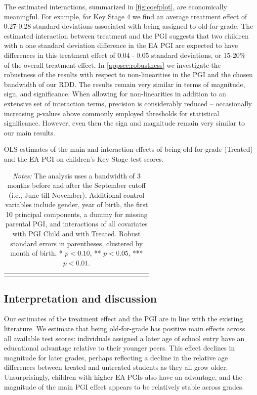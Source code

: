 \documentclass[12pt,a4paper]{article}
\begin{document}
\begin{bibunit}
The estimated interactions, summarized in \autoref{fig:coefplot}, are economically meaningful. For example, for Key Stage 4 we find an average treatment effect of 0.27-0.28 standard deviations associated with being assigned to old-for-grade. The estimated interaction between treatment and the PGI suggests that two children with a one standard deviation difference in the EA PGI are expected to have differences in this treatment effect of 0.04 - 0.05 standard deviations, or 15-20\% of the overall treatment effect. In \autoref{appsec:robustness} we investigate the robustness of the results with respect to non-linearities in the PGI and the chosen bandwidth of our RDD. The results remain very similar in terms of magnitude, sign, and significance. When allowing for non-linearities in addition to an extensive set of interaction terms, precision is considerably reduced -- occasionally increasing \textit{p}-values above commonly employed thresholds for statistical significance. However, even then the sign and magnitude remain very similar to our main results. 

\begin{table}
\caption{OLS estimates of the main and interaction effects of being old-for-grade (Treated) and the EA PGI on children's Key Stage test scores.}
\centering
{\scriptsize
\begin{tabular}{lcccccccccccccccccccc}
\toprule

\bottomrule
\addlinespace[.75ex]
\end{tabular}
\label{tab:MoB_ks}
}
\caption*{\scriptsize \noindent \textit{Notes:} The analysis uses a bandwidth of 3 months before and after the September cutoff (i.e., June till November). Additional control variables include gender, year of birth, the first 10 principal components, a dummy for missing parental PGI, and interactions of all covariates with PGI Child and with Treated. Robust standard errors in parentheses, clustered by month of birth. * $p < 0.10$, ** $p < 0.05$, *** $p < 0.01$.}
\end{table}

\subsection{Interpretation and discussion} \label{sec:interpret}

Our estimates of the treatment effect and the PGI are in line with the existing literature.
We estimate that being old-for-grade has positive main effects across all available test scores: individuals assigned a later age of school entry have an educational advantage relative to their younger peers. This effect declines in magnitude for later grades, perhaps reflecting a decline in the relative age differences between treated and untreated students as they all grow older.  Unsurprisingly, children with higher EA PGIs also have an advantage, and the magnitude of the main PGI effect appears to be relatively stable across grades. 


\end{bibunit}
\end{document}
